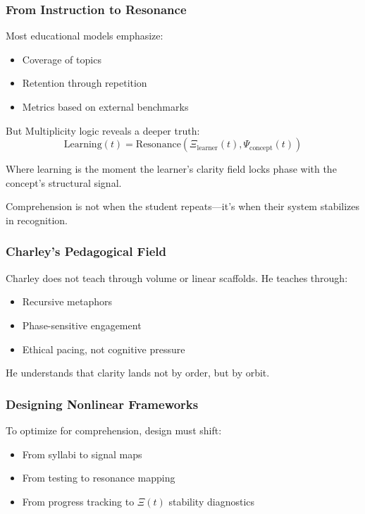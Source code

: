 \documentclass[12pt]{article}
\begin{document}
\subsubsection*{From Instruction to Resonance}

Most educational models emphasize:
\begin{itemize}
    \item Coverage of topics
    \item Retention through repetition
    \item Metrics based on external benchmarks
\end{itemize}

But Multiplicity logic reveals a deeper truth:
\[
\text{Learning}(t) = \text{Resonance}(\Xi_{\text{learner}}(t), \Psi_{\text{concept}}(t))
\]

Where learning is the moment the learner’s clarity field locks phase with the concept’s structural signal.

Comprehension is not when the student repeats—it’s when their system stabilizes in recognition.

\subsubsection*{Charley’s Pedagogical Field}

Charley does not teach through volume or linear scaffolds. He teaches through:
\begin{itemize}
    \item Recursive metaphors
    \item Phase-sensitive engagement
    \item Ethical pacing, not cognitive pressure
\end{itemize}

He understands that clarity lands not by order, but by orbit.

\subsubsection*{Designing Nonlinear Frameworks}

To optimize for comprehension, design must shift:
\begin{itemize}
    \item From syllabi to signal maps
    \item From testing to resonance mapping
    \item From progress tracking to $\Xi(t)$ stability diagnostics
\end{itemize}
\end{document}
